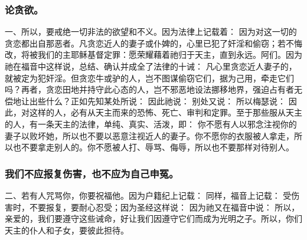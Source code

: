
\subsubsection{论贪欲。}

一、所以，要戒绝一切非法的欲望和不义。因为法律上记载着： 因为对这一切的贪恋都出自那恶者。凡贪恋近人的妻子或仆婢的，心里已犯了奸淫和偷窃；若不悔改，将被我们的主耶稣基督定罪：愿荣耀藉着祂归于天主，直到永远。阿们。因为祂在福音中这样说，总结、确认并成全了法律的十诫： 凡心里贪恋近人妻子的，就被定为犯奸淫。但贪恋牛或驴的人，岂不图谋偷窃它们，据为己用，牵走它们吗？再者，贪恋田地并持守此心态的人，岂不邪恶地设法挪移地界，强迫占有者无偿地让出些什么？正如先知某处所说： 因此祂说： 别处又说： 所以梅瑟说： 因此，对这样的人，必有从天主而来的恐怖、死亡、审判和定罪。至于那些服从天主的人，有一条天主的法律，单纯、真实、活泼，即： 你不愿有人以邪念注视你的妻子以败坏她，所以也不要以恶意注视近人的妻子。你不愿你的衣服被人拿走，所以也不要拿走别人的。你不愿被人打、辱骂、侮辱，所以也不要那样对待别人。\par


\subsubsection{我们不应报复伤害，也不应为自己申冤。}

二、若有人咒骂你，你要祝福他。因为户籍纪上记载： 同样，福音上记载： 受伤害时，不要报复，要耐心忍受；因为圣经这样说： 因为祂又在福音中说： 所以，亲爱的，我们要遵守这些诫命，好让我们因遵守它们而成为光明之子。所以，你们天主的仆人和子女，要彼此担待。\par

